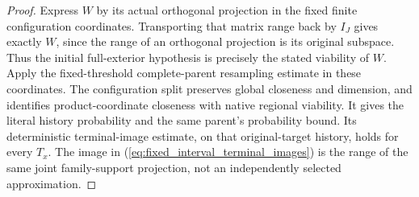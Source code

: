 \begin{proof}\leanok
    Express $W$ by its actual orthogonal projection in the fixed finite
    configuration coordinates. Transporting that matrix range back by
    $I_J$ gives exactly $W$, since the range of an orthogonal projection
    is its original subspace. Thus the initial full-exterior hypothesis
    is precisely the stated viability of $W$.
    Apply the fixed-threshold complete-parent resampling estimate in these
    coordinates. The configuration split preserves global closeness and
    dimension, and identifies product-coordinate closeness with native
    regional viability. It gives the literal history probability and
    the same parent's probability bound. Its deterministic terminal-image
    estimate, on that original-target history, holds for every $T_x$.
    The image in (\ref{eq:fixed_interval_terminal_images}) is the range
    of the same joint family-support projection, not an independently
    selected approximation.
\end{proof}
